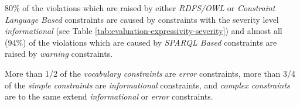 \documentclass[conference]{IEEEtran}
\begin{document}
80\% of the violations which are raised by either \emph{RDFS/OWL} or \emph{Constraint Language Based} constraints are caused by constraints with the severity level \emph{informational} (see Table \ref{tab:evaluation-expressivity-severity}) and almost all (94\%) of the violations which are caused by \emph{SPARQL Based} constraints are raised by \emph{warning} constraints. 

More than 1/2 of the \emph{vocabulary constraints} are \emph{error} constraints,
more than 3/4 of the \emph{simple constraints} are \emph{informational} constraints, and
\emph{complex constraints} are to the same extend \emph{informational} or \emph{error} constraints. 

\end{document}

